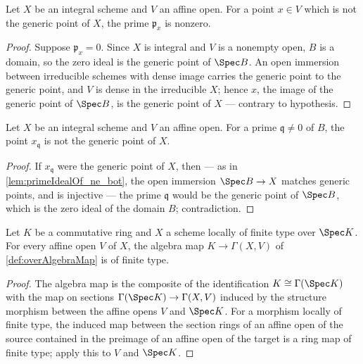 \begin{lemma}
  \label{lem:primeIdealOf_ne_bot}
  \leanok
  Let \(X\) be an integral scheme and \(V\) an affine open. For a point \(x \in V\)
  which is not the generic point of \(X\), the prime \(\mathfrak p_x\) is nonzero.
\end{lemma}
\begin{proof}
  \leanok
  Suppose \(\mathfrak p_x = 0\). Since \(X\) is integral and \(V\) is a nonempty open,
  \(B\) is a domain, so the zero ideal is the generic point of \(\Spec B\). An open
  immersion between irreducible schemes with dense image carries the generic point to
  the generic point, and \(V\) is dense in the irreducible \(X\); hence \(x\), the
  image of the generic point of \(\Spec B\), is the generic point of \(X\) ---
  contrary to hypothesis.
\end{proof}

\begin{lemma}
  \label{lem:fromSpec_base_ne_genericPoint}
  \leanok
  Let \(X\) be an integral scheme and \(V\) an affine open. For a prime
  \(\mathfrak q \neq 0\) of \(B\), the point \(x_{\mathfrak q}\) is not the generic
  point of \(X\).
\end{lemma}
\begin{proof}
  \leanok
  If \(x_{\mathfrak q}\) were the generic point of \(X\), then --- as in
  \ref{lem:primeIdealOf_ne_bot}, the open immersion \(\Spec B \to X\) matches generic
  points, and is injective --- the prime \(\mathfrak q\) would be the generic point of
  \(\Spec B\), which is the zero ideal of the domain \(B\); contradiction.
\end{proof}

\begin{theorem}
  \label{thm:overAlgebraMap_finiteType}
  \leanok
  Let \(K\) be a commutative ring and \(X\) a scheme locally of finite type over
  \(\Spec K\). For every affine open \(V\) of \(X\), the algebra map
  \(K \to \Gamma(X, V)\) of \ref{def:overAlgebraMap} is of finite type.
\end{theorem}
\begin{proof}
  \leanok
  The algebra map is the composite of the identification \(K \cong \Gamma(\Spec K)\)
  with the map on sections \(\Gamma(\Spec K) \to \Gamma(X, V)\) induced by the
  structure morphism between the affine opens \(V\) and \(\Spec K\). For a morphism
  locally of finite type, the induced map between the section rings of an affine open
  of the source contained in the preimage of an affine open of the target is a ring
  map of finite type; apply this to \(V\) and \(\Spec K\).
\end{proof}

